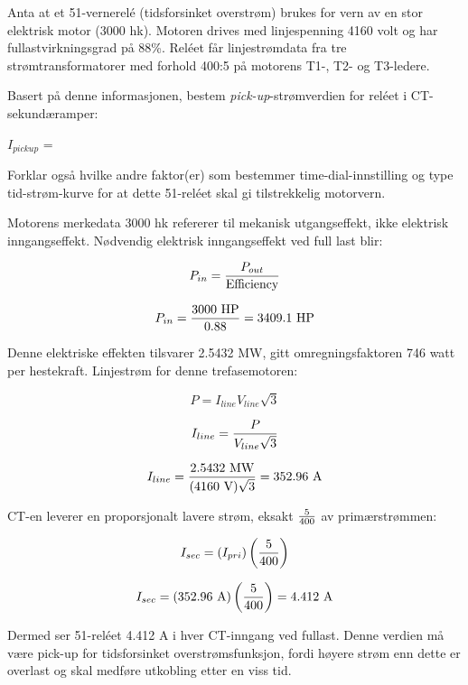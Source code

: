 

Anta at et 51-vernerelé (tidsforsinket overstrøm) brukes for vern av en stor elektrisk motor (3000 hk). Motoren drives med linjespenning 4160 volt og har fullastvirkningsgrad på 88\%. Reléet får linjestrømdata fra tre strømtransformatorer med forhold 400:5 på motorens T1-, T2- og T3-ledere.

\vskip 10pt

Basert på denne informasjonen, bestem {\it pick-up}-strømverdien for reléet i CT-sekundæramper:

\vskip 10pt

$I_{pickup}$ = \underbar{\hskip 50pt}

\vskip 10pt

Forklar også hvilke andre faktor(er) som bestemmer time-dial-innstilling og type tid-strøm-kurve for at dette 51-reléet skal gi tilstrekkelig motorvern.







Motorens merkedata 3000 hk refererer til mekanisk utgangseffekt, ikke elektrisk inngangseffekt. Nødvendig elektrisk inngangseffekt ved full last blir:

$$P_{in} = {P_{out} \over \hbox{Efficiency}}$$

$$P_{in} = {3000 \hbox{ HP} \over 0.88} = 3409.1 \hbox{ HP}$$

Denne elektriske effekten tilsvarer 2.5432 MW, gitt omregningsfaktoren 746 watt per hestekraft. Linjestrøm for denne trefasemotoren:

$$P = I_{line} V_{line} \sqrt{3}$$

$$I_{line} = {P \over V_{line} \sqrt{3}}$$

$$I_{line} = {2.5432 \hbox{ MW} \over (4160 \hbox{ V}) \sqrt{3}} = 352.96 \hbox{ A}$$

CT-en leverer en proporsjonalt lavere strøm, eksakt $5 \over 400$ av primærstrømmen:

$$I_{sec} = (I_{pri}) \left({5 \over 400}\right)$$

$$I_{sec} = (352.96 \hbox{ A}) \left({5 \over 400}\right) = 4.412 \hbox{ A}$$

Dermed ser 51-reléet 4.412 A i hver CT-inngang ved fullast. Denne verdien må være pick-up for tidsforsinket overstrømsfunksjon, fordi høyere strøm enn dette er overlast og skal medføre utkobling etter en viss tid.

